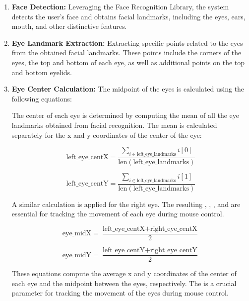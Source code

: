 \documentclass[letterpaper, 10 pt, conference]{ieeeconf}  %
\begin{document}
\begin{enumerate}
    \item \textbf{Face Detection:} Leveraging the Face Recognition Library, the system detects the user's face and obtains facial landmarks, including the eyes, ears, mouth, and other distinctive features.
    
    \item \textbf{Eye Landmark Extraction:} Extracting specific points related to the eyes from the obtained facial landmarks. These points include the corners of the eyes, the top and bottom of each eye, as well as additional points on the top and bottom eyelids.
    
\item \textbf{Eye Center Calculation:} The midpoint of the eyes is calculated using the following equations:

The center of each eye is determined by computing the mean of all the eye landmarks obtained from facial recognition. The mean is calculated separately for the x and y coordinates of the center of the eye:

\begin{equation}
\text{{left\_eye\_centX}} = \frac{{\sum_{{i \in \text{{left\_eye\_landmarks}}}} i[0]}}{{\text{{len}}(\text{{left\_eye\_landmarks}})}}
\end{equation}

\begin{equation}
\text{{left\_eye\_centY}} = \frac{{\sum_{{i \in \text{{left\_eye\_landmarks}}}} i[1]}}{{\text{{len}}(\text{{left\_eye\_landmarks}})}}
\end{equation}

A similar calculation is applied for the right eye. The resulting , , , and  are essential for tracking the movement of each eye during mouse control.

\begin{equation}
\text{{eye\_midX}} = \frac{{\text{{left\_eye\_centX}} + \text{{right\_eye\_centX}}}}{2}
\end{equation}

\begin{equation}
\text{{eye\_midY}} = \frac{{\text{{left\_eye\_centY}} + \text{{right\_eye\_centY}}}}{2}
\end{equation}

These equations compute the average x and y coordinates of the center of each eye and the midpoint between the eyes, respectively. The  is a crucial parameter for tracking the movement of the eyes during mouse control.


\end{enumerate}
\end{document}

